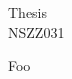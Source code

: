 \documentclass{article}
\begin{document}
\begin{center}
  \Large{Thesis} \\\large{NSZZ031}
\end{center}

Foo
\end{document}
